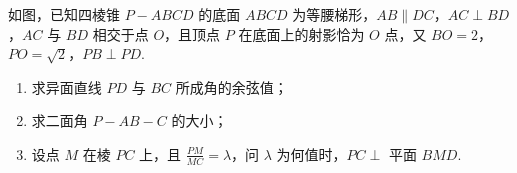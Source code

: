 \begin{problem}
如图，已知四棱锥 \(P - ABCD\) 的底面 \(ABCD\) 为等腰梯形，\(AB \parallel DC\)，\(AC \perp BD\)，\(AC\) 与 \(BD\) 相交于点 \(O\)，且顶点 \(P\) 在底面上的射影恰为 \(O\) 点，又 \(BO = 2\)，\(PO = \sqrt{2}\)，\(PB \perp PD\).

\begin{enumerate}
\item 求异面直线 \(PD\) 与 \(BC\) 所成角的余弦值；
\item 求二面角 \(P - AB - C\) 的大小；
\item 设点 \(M\) 在棱 \(PC\) 上，且 \(\frac{PM}{MC} = \lambda\)，问 \(\lambda\) 为何值时，\(PC \perp\) 平面 \(BMD\).
\end{enumerate}

\end{problem}

